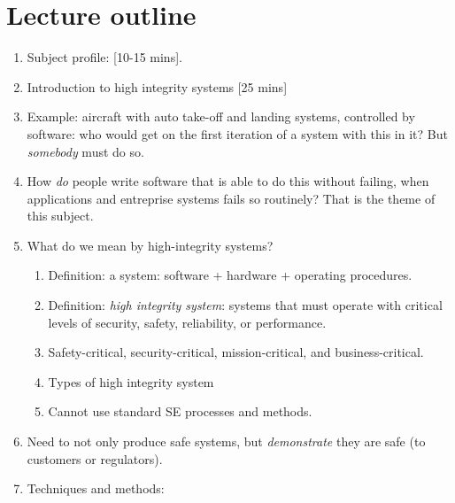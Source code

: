 \documentclass[11pt]{article}
\begin{document}
\section*{Lecture outline}

\begin{enumerate}

 \item Subject profile: [10-15 mins].

 \item Introduction to high integrity systems [25 mins]

 \item Example: aircraft with auto take-off and landing systems, controlled by software: who would get on the first iteration of a system with this in it? But \emph{somebody} must do so.

 \item How \emph{do} people write software that is able to do this without failing, when applications and entreprise systems fails so routinely? That is the theme of this subject.

 \item What do we mean by high-integrity systems?

    \begin{enumerate}

     \item Definition: a system: software + hardware + operating procedures.

     \item Definition: \emph{high integrity system}: systems that must operate with critical levels of security, safety, reliability, or performance.

     \item Safety-critical, security-critical, mission-critical, and business-critical.

     \item Types of high integrity system

     \item Cannot use standard SE processes and methods.

    \end{enumerate}


 \item Need to not only produce safe systems, but \emph{demonstrate} they are safe (to customers or regulators).

 \item Techniques and methods:


\end{enumerate}
\end{document}
